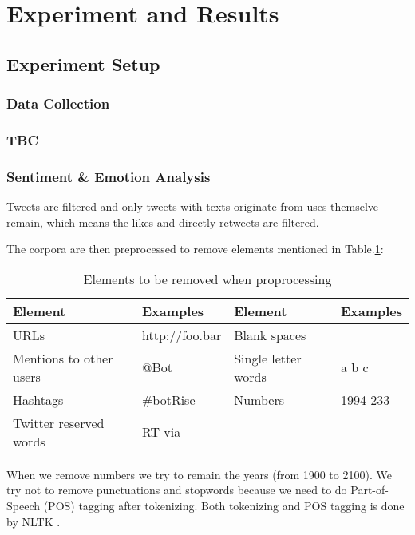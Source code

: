 \section{Experiment and Results}

\subsection{Experiment Setup}

\subsubsection{Data Collection}

\subsubsection{TBC}

\subsubsection{Sentiment \& Emotion Analysis}

Tweets are filtered and only tweets with texts originate from uses themselve remain, which means the likes and directly retweets are filtered.

The corpora are then preprocessed to remove elements mentioned in Table.\ref{table:elementsRemoved}:

\begin{table}[h]
  \caption{Elements to be removed when proprocessing}
  \label{table:elementsRemoved}
  \centering
  \renewcommand{\tabularxcolumn}{m} %
  \begin{tabularx}{\textwidth}{l  l || l  l}
    \toprule
    \textbf{Element} & \textbf{Examples} & \textbf{Element}    & \textbf{Examples}
    \tabularnewline \midrule
    URLs
                     &
    http://foo.bar   & Blank spaces      &
    \tabularnewline \hline
    Mentions to other users
                     & @Bot              & Single letter words & a b c
    \tabularnewline \hline
    Hashtags
                     & \#botRise         & Numbers             & 1994 233
    \tabularnewline \hline
    Twitter reserved words
                     & RT via            &
                     &
    \tabularnewline \bottomrule
  \end{tabularx}
\end{table}

When we remove numbers we try to remain the years (from 1900 to 2100).
We try not to remove punctuations and stopwords because we need to do Part-of-Speech (POS) tagging after tokenizing. Both tokenizing and POS tagging is done by NLTK \citep{NLTK}.

